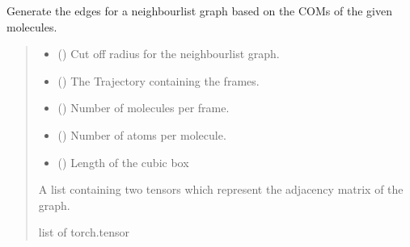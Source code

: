 \documentclass[a4paper,10pt,english]{report}
\begin{document}

\begin{fulllineitems}
\label{\detokenize{NNucleate:NNucleate.utils.get_mol_edges}}
\pysigstartsignatures
{}
\pysigstopsignatures
\sphinxAtStartPar
Generate the edges for a neighbourlist graph based on the COMs of the given molecules.
\begin{quote}\begin{description}
\begin{itemize}
\item {} 
\sphinxAtStartPar
{} () \textendash{} Cut off radius for the neighbourlist graph.

\item {} 
\sphinxAtStartPar
{} () \textendash{} The Trajectory containing the frames.

\item {} 
\sphinxAtStartPar
{} () \textendash{} Number of molecules per frame.

\item {} 
\sphinxAtStartPar
{} () \textendash{} Number of atoms per molecule.

\item {} 
\sphinxAtStartPar
{} () \textendash{} Length of the cubic box

\end{itemize}

\sphinxAtStartPar
A list containing two tensors which represent the adjacency matrix of the graph.

\sphinxAtStartPar
list of torch.tensor

\end{description}\end{quote}

\end{fulllineitems}
\end{document}
